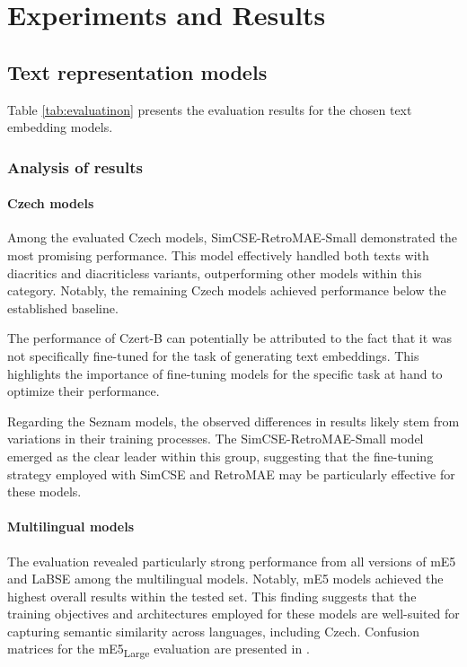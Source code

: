 
\chapter{Experiments and Results \label{chap:experiments_and_results}}

\section{Text representation models}
Table \ref{tab:evaluatinon} presents the evaluation results for the chosen text embedding models.

\subsection{Analysis of results}
\subsubsection{Czech models}
Among the evaluated Czech models, SimCSE-RetroMAE-Small demonstrated the most promising performance.
This model effectively handled both texts with diacritics and diacriticless variants, outperforming other models within this category.
Notably, the remaining Czech models achieved performance below the established baseline.

The performance of Czert-B can potentially be attributed to the fact that it was not specifically fine-tuned for the task of generating text embeddings.
This highlights the importance of fine-tuning models for the specific task at hand to optimize their performance.

Regarding the Seznam models, the observed differences in results likely stem from variations in their training processes.
The SimCSE-RetroMAE-Small model emerged as the clear leader within this group, suggesting that the fine-tuning strategy employed with \ac{SimCSE} and \ac{RetroMAE} may be particularly effective for these models.

\subsubsection{Multilingual models}
The evaluation revealed particularly strong performance from all versions of \ac{mE5} and \ac{LaBSE} among the multilingual models.
Notably, \ac{mE5} models achieved the highest overall results within the tested set.
This finding suggests that the training objectives and architectures employed for these models are well-suited for capturing semantic similarity across languages, including Czech.
Confusion matrices for the \ac{mE5}\textsubscript{Large} evaluation are presented in .

